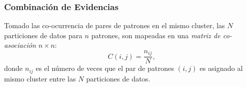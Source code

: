 \begin{frame}
	\frametitle{Combinación de Evidencias}
	Tomado las co-ocurrencia de pares de patrones en el mismo cluster, las \(N\) particiones de datos para \(n\) patrones, son mapeadas en una \textit{matriz de co-asociación} \(n \times n\):
	\medskip
	\[C(i,j)=\frac{n_{ij}}{N},\]
	\medskip
	donde \(n_{ij}\) es el número de veces que el par de patrones \((i,j)\) es asignado al mismo cluster entre las \(N\) particiones de datos.
\end{frame}
